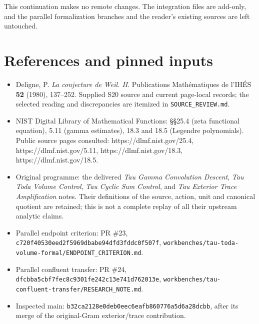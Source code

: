 This continuation makes no remote changes. The integration files are
add-only, and the parallel formalization branches and the reader's
existing sources are left untouched.

\section{References and pinned
inputs}\label{references-and-pinned-inputs}

\begin{itemize}
\tightlist
\item
  Deligne, P. \emph{La conjecture de Weil. II}. Publications
  Mathématiques de l'IHÉS \textbf{52} (1980), 137--252. Supplied S20
  source and current page-local records; the selected reading and
  discrepancies are itemized in \texttt{SOURCE\_REVIEW.md}.
\item
  NIST Digital Library of Mathematical Functions: §§25.4 (zeta
  functional equation), 5.11 (gamma estimates), 18.3 and 18.5 (Legendre
  polynomials). Public source pages consulted:
  https://dlmf.nist.gov/25.4, https://dlmf.nist.gov/5.11,
  https://dlmf.nist.gov/18.3, https://dlmf.nist.gov/18.5.
\item
  Original programme: the delivered \emph{Tau Gamma Convolution
  Descent}, \emph{Tau Toda Volume Control}, \emph{Tau Cyclic Sum
  Control}, and \emph{Tau Exterior Trace Amplification} notes. Their
  definitions of the source, action, unit and canonical quotient are
  retained; this is not a complete replay of all their upstream analytic
  claims.
\item
  Parallel endpoint criterion: PR \#23,
  \nolinkurl{c720f40530eed2f5969dbabe94dfd3fddc0f507f},
  \texttt{workbenches/tau-toda-volume-formal/ENDPOINT\_CRITERION.md}.
\item
  Parallel confluent transfer: PR \#24,
  \nolinkurl{dfcbba5cbf7fec8c9301fe242c13e741d762013e},
  \texttt{workbenches/tau-confluent-transfer/RESEARCH\_NOTE.md}.
\item
  Inspected main: \nolinkurl{b32ca2128e0deb0eec6eafb860776a5d6a28dcbb},
  after its merge of the original-Gram exterior/trace contribution.
\end{itemize}

